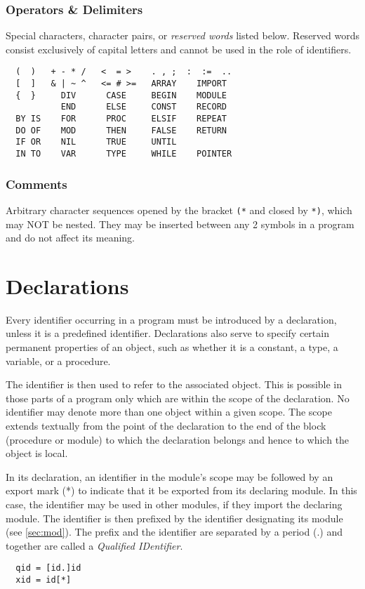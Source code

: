 \subsubsection{Operators \& Delimiters}
Special characters, character pairs, or \emph{reserved words} listed below. Reserved words
consist exclusively of capital letters and cannot be used in the role of identifiers.
\begin{verbatim}
  (  )   + - * /   <  = >    . , ;  :  :=  ..
  [  ]   & | ~ ^   <= # >=   ARRAY    IMPORT
  {  }     DIV      CASE     BEGIN    MODULE
           END      ELSE     CONST    RECORD
  BY IS    FOR      PROC     ELSIF    REPEAT
  DO OF    MOD      THEN     FALSE    RETURN
  IF OR    NIL      TRUE     UNTIL
  IN TO    VAR      TYPE     WHILE    POINTER
\end{verbatim}

\subsubsection{Comments}
Arbitrary character sequences opened by the bracket \verb|(*| and closed by \verb|*)|,
which may NOT be nested. They may be inserted between any 2 symbols in a program and do
not affect its meaning.

\section{Declarations}
\label{sec:DS}
Every identifier occurring in a program must be introduced by a declaration, unless it is
a predefined identifier. Declarations also serve to specify certain permanent properties
of an object, such as whether it is a constant, a type, a variable, or a procedure.

The identifier is then used to refer to the associated object. This is possible in those
parts of a program only which are within the scope of the declaration. No identifier may
denote more than one object within a given scope. The scope extends textually from the
point of the declaration to the end of the block (procedure or module) to which the
declaration belongs and hence to which the object is local.

In its declaration, an identifier in the module's scope may be followed by an export mark
(*) to indicate that it be exported from its declaring module. In this case, the identifier
may be used in other modules, if they import the declaring module. The identifier is then
prefixed by the identifier designating its module (see \ref{sec:mod}). The prefix and the
identifier are separated by a period (.) and together are called a \emph{Qualified IDentifier}.
\begin{verbatim}
  qid = [id.]id
  xid = id[*]
\end{verbatim}


